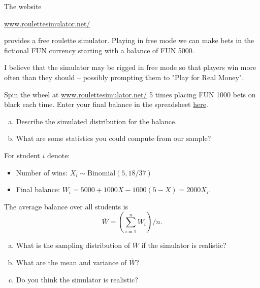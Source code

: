 \begin{frame}

  \begin{block}{\example}
    The website
    \begin{center}
      \href{https://www.roulettesimulator.net/}{www.roulettesimulator.net/}
    \end{center}
    provides a free roulette simulator. Playing in free mode we can make bets in the fictional FUN currency starting with a balance of FUN 5000.
    
    \medskip
    
    I believe that the simulator may be rigged in free mode so that players win more often than they should -- possibly prompting them to "Play for Real Money".
    \end{block}
\end{frame}

\begin{frame}

  \begin{block}{\examplectd}
  Spin the wheel at \href{https://www.roulettesimulator.net/}{www.roulettesimulator.net/} 5 times placing FUN 1000 bets on black each time. Enter your final balance in the spreadsheet  \href{https://uwoca-my.sharepoint.com/:x:/g/personal/sbonner6_uwo_ca/Ee3I7Ds8g81In0-dQO_MD60BbE2CyrRa_XifWRR55PMDxw?e=uXgrB5}{here}.
    
    \begin{enumerate}[a)]
    \item Describe the simulated distribution for the balance.
      
    \item What are some statistics you could compute from our sample?
    \end{enumerate}
  \end{block}
\end{frame}

\begin{frame}

  \begin{block}{\example}
    For student $i$ denote:
    \begin{itemize}
    \item Number of wins: $X_i \sim \mbox{Binomial}(5,18/37)$
    \item Final balance: $W_i=5000+1000X - 1000(5-X)=2000X_i$.
    \end{itemize}
    
    The average balance over all students is
    $$
    \bar W=\left(\sum_{i=1}^n W_i\right)/n.
    $$

    \begin{enumerate}[a)]
    \item What is the sampling distribution of $\bar W$ if the simulator is realistic?
    \item What are the mean and variance of $\bar W$?
    \item Do you think the simulator is realistic?
    \end{enumerate}
  \end{block}
\end{frame}

